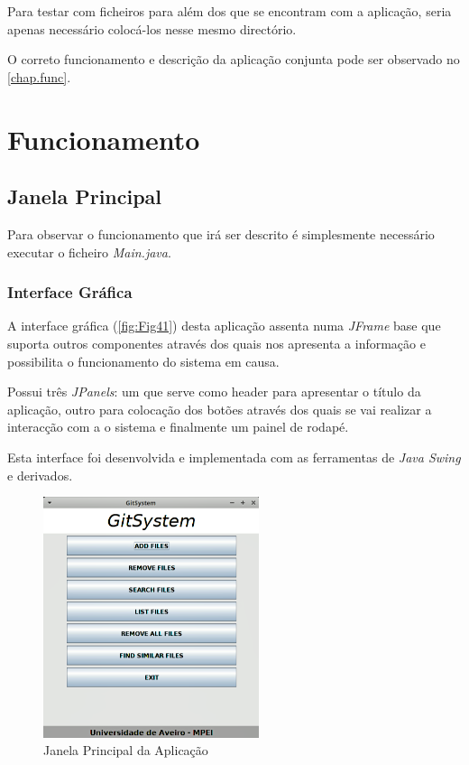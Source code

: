 \documentclass{report}
\begin{document}
Para testar com ficheiros para além dos que se encontram com a aplicação, seria apenas necessário colocá-los nesse mesmo directório.

O correto funcionamento e descrição da aplicação conjunta pode ser observado no \autoref{chap.func}.





\chapter{Funcionamento}
\label{chap.func}
\section{Janela Principal}

Para observar o funcionamento que irá ser descrito é simplesmente necessário executar o ficheiro {\itshape Main.java}.
\subsection{Interface Gráfica}

A interface gráfica (\autoref{fig:Fig41}) desta aplicação assenta numa {\itshape JFrame} base que suporta outros componentes através dos quais nos apresenta a informação e possibilita o funcionamento do sistema em causa.

Possui três {\itshape JPanels}: um que serve como header para apresentar o título da aplicação, outro para colocação dos botões através dos quais se vai realizar a interacção com a o sistema e finalmente um painel de rodapé.

Esta interface foi desenvolvida e implementada com as ferramentas de {\itshape Java Swing} e derivados.

\begin{figure}[h]
\center %
\includegraphics[height=200pt]{MainPage.png}
\caption{Janela Principal da Aplicação}
\label{fig:Fig41}
\end{figure}
\end{document}
